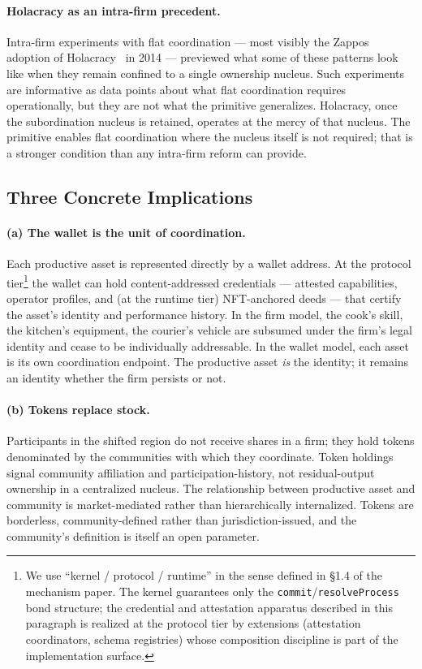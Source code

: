 \documentclass[11pt,a4paper]{article}
\theoremstyle{definition}
\theoremstyle{remark}
\begin{document}
\paragraph{Holacracy as an intra-firm precedent.}
Intra-firm experiments with flat coordination --- most visibly the
Zappos adoption of Holacracy~\citep{robertson2015holacracy} in 2014
--- previewed what some of these patterns look like when they
remain confined to a single ownership nucleus. Such experiments are informative as data points
about what flat coordination requires operationally, but they are
not what the primitive generalizes. Holacracy, once the
subordination nucleus is retained, operates at the mercy of that
nucleus. The primitive enables flat coordination where the nucleus
itself is not required; that is a stronger condition than any
intra-firm reform can provide.

\subsection{Three Concrete Implications}

\paragraph{(a) The wallet is the unit of coordination.}
Each productive asset is represented directly by a wallet address.
At the protocol tier\footnote{We use ``kernel / protocol /
runtime'' in the sense defined in §1.4 of the mechanism paper.
The kernel guarantees only the \texttt{commit}/\texttt{resolveProcess}
bond structure; the credential and attestation apparatus described
in this paragraph is realized at the protocol tier by extensions
(attestation coordinators, schema registries) whose composition
discipline is part of the implementation surface.} the wallet can hold
content-addressed credentials --- attested capabilities, operator
profiles, and (at the runtime tier) NFT-anchored deeds --- that
certify the asset's identity and performance history. In the firm
model, the cook's skill, the kitchen's equipment, the courier's
vehicle are subsumed under the firm's legal identity and cease to be
individually addressable. In the wallet model, each asset is its
own coordination endpoint. The productive asset \emph{is} the
identity; it remains an identity whether the firm persists or not.

\paragraph{(b) Tokens replace stock.}
Participants in the shifted region do not receive shares in a firm;
they hold tokens denominated by the communities with which they
coordinate. Token holdings signal community affiliation and
participation-history, not residual-output ownership in a
centralized nucleus. The relationship between productive asset and
community is market-mediated rather than hierarchically
internalized. Tokens are borderless, community-defined rather than
jurisdiction-issued, and the community's definition is itself an
open parameter.
\end{document}
